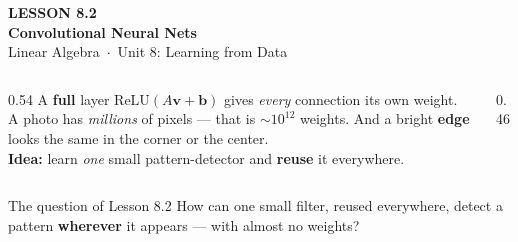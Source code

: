\documentclass[aspectratio=169, 11pt]{beamer}
\newcommand{\vv}{\mathbf{v}}
\newcommand{\bb}{\mathbf{b}}
\newcommand{\relu}{\mathrm{ReLU}}
\begin{document}
{
\begin{frame}[plain]
  \vspace{2.8cm}\hspace{0.55cm}%
  \begin{minipage}{0.9\textwidth}
    {\color{goldacc}\bfseries\small LESSON 8.2}\\[0.5cm]
    {\color{white}\bfseries\LARGE Convolutional Neural Nets}\\[1.0cm]
    {\color{blushmid}\small Linear Algebra~$\cdot$~Unit 8: Learning from Data}
  \end{minipage}
\end{frame}
}

\begin{frame}[t, plain]
  \begin{columns}[T]
    \begin{column}{0.54\textwidth}
      A \textbf{full} layer $\relu(A\vv+\bb)$ gives \emph{every} connection its own weight.\\[6pt]
      A photo has \emph{millions} of pixels --- that is $\sim\!10^{12}$ weights. And a bright \textbf{edge}
      looks the same in the corner or the center.\\[6pt]
      \textbf{Idea:} learn \emph{one} small pattern-detector and \textbf{reuse} it everywhere.
    \end{column}
    \begin{column}{0.46\textwidth}
      \centering
    \end{column}
  \end{columns}
  \vspace{2pt}
  \begin{block}{The question of Lesson 8.2}
    How can one small filter, reused everywhere, detect a pattern \textbf{wherever} it appears --- with almost
    no weights?
  \end{block}
\end{frame}
\end{document}
